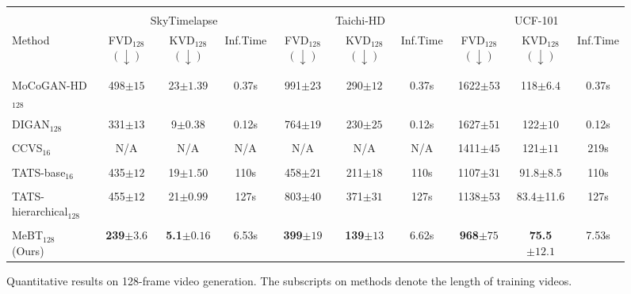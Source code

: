 \documentclass[10pt,twocolumn,letterpaper]{article}
\begin{document}
\begin{figure*}[!ht]
    \begin{minipage}{\textwidth}
    \captionsetup{type=table}
    \centering
    \caption{Quantitative results on 128-frame video generation. The subscripts on methods denote the length of training videos.}
    \vspace{-0.2cm}
\begin{adjustbox}{width=1.0\textwidth}
    \label{tab:longterm}
    \centering
        \begin{tabular}{lccccccccc}
        \toprule
        \\[-1em]& \multicolumn{3}{c}{SkyTimelapse} & \multicolumn{3}{c}{Taichi-HD} & \multicolumn{3}{c}{UCF-101} \\
        \cmidrule(lr){2-4} \cmidrule(lr){5-7} \cmidrule(lr){8-10}
        Method 
        & FVD$_{128}$  $(\downarrow)$ & KVD$_{128}$  $(\downarrow)$ & Inf.Time & FVD$_{128}$  $(\downarrow)$ & KVD$_{128}$  $(\downarrow)$ & Inf.Time
        & FVD$_{128}$  $(\downarrow)$ & KVD$_{128}$  $(\downarrow)$ & Inf.Time\\
        \\[-1em]\Xhline{2\arrayrulewidth}
        \\[-1em]MoCoGAN-HD$_{128}$ & 498\tiny{$\pm 15$} & 23\tiny{$\pm1.39$} & 0.37s & 991\tiny{$\pm23$} & 290\tiny{$\pm12$} & 0.37s & 1622\tiny{$\pm53$} & 118\tiny{$\pm6.4$} & 0.37s\\
        \\[-1em]DIGAN$_{128}$ & 331\tiny{$\pm13$} & 9\tiny{$\pm0.38$} & {0.12s} & 764\tiny{$\pm19$} & 230\tiny{$\pm25$} & {0.12s} & 1627\tiny{$\pm51$} & 122\tiny{$\pm10$} & {0.12s}\\\hline
        \\[-1em]CCVS$_{16}$ & N/A & N/A & N/A & N/A & N/A & N/A & 1411\tiny{$\pm45$} & 121\tiny{$\pm11$} & 219s \\
        \\[-1em]TATS-base$_{16}$ & 435\tiny{$\pm12$} & 19\tiny{$\pm1.50$} & 110s & 458\tiny{$\pm21$} & 211\tiny{$\pm18$} & 110s & 1107\tiny{$\pm31$} & 91.8\tiny{$\pm8.5$} & 110s\\
        \\[-1em]TATS-hierarchical$_{128}$ & 455\tiny{$\pm12$} & 21\tiny{$\pm0.99$} & 127s & 803\tiny{$\pm40$} & 371\tiny{$\pm31$} & 127s & 1138\tiny{$\pm53$} & 83.4\tiny{$\pm$11.6} & 127s\\\\[-1em]MeBT$_{128}$ (Ours) & \bf{239\tiny{$\pm3.6$}} & \bf{5.1\tiny{$\pm0.16$}} & 6.53s & \bf{399\tiny{$\pm19$}} & \bf{139\tiny{$\pm13$}} & 6.62s & \bf{968\tiny{$\pm75$}} & \bf{75.5\tiny{$\pm12.1$}} & 7.53s\\
        \bottomrule
        \end{tabular}
    \end{adjustbox}
    \end{minipage}
    \vspace{0.1cm}
    

\end{figure*}
\end{document}
